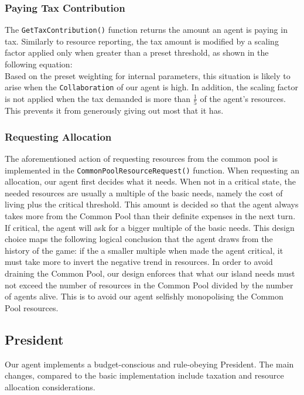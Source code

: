 \subsubsection{Paying Tax Contribution}
The \texttt{GetTaxContribution()} function returns the amount an agent is paying in tax. Similarly to resource reporting, the tax amount is modified by a scaling factor applied only when greater than a preset threshold, as shown in the following equation: 
\begin{equation}
    [1 + (Scaling \: Factor - Preset \: Threshold)]
\end{equation}
Based on the preset weighting for internal parameters, this situation is likely to arise when the \texttt{Collaboration} of our agent is high. In addition, the scaling factor is not applied when the tax demanded is more than $\frac{1}{5}$ of the agent's resources. This prevents it from generously giving out most that it has.

\subsubsection{Requesting Allocation}\label{subsubsection:CommonPoolResourceRequest()}
The aforementioned action of requesting resources from the common pool is implemented in the \texttt{CommonPoolResourceRequest()} function. When requesting an allocation, our agent first decides what it needs. When not in a critical state, the needed resources are usually a multiple of the basic needs, namely the cost of living plus the critical threshold. This amount is decided so that the agent always takes more from the Common Pool than their definite expenses in the next turn. If critical, the agent will ask for a bigger multiple of the basic needs. This design choice maps the following logical conclusion that the agent draws from the history of the game: if the a smaller multiple when made the agent critical, it must take more to invert the negative trend in resources. In order to avoid draining the Common Pool, our design enforces that what our island needs must not exceed the number of resources in the Common Pool divided by the number of agents alive. This is to avoid our agent selfishly monopolising the Common Pool resources.

\subsection{President}
\label{subsec:team4:president}
Our agent implements a budget-conscious and rule-obeying President. The main changes, compared to the basic implementation include taxation and resource allocation considerations.

